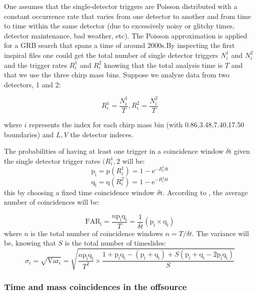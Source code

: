 \documentclass[epsf]{article}
\begin{document}
One assumes that the single-detector triggers are Poisson distributed with a constant occurrence rate that varies from one detector to another and from time to time within the same detector (due to excessively noisy or glitchy times, detector maintenance, bad weather, etc). The Poisson approximation is applied for a GRB search that spans a time of around 2000s.By inspecting the first inspiral files one could get the total number of single detector triggers $N_{i}^1$ and $N_{i}^2$ and the trigger rates $R_{i}^1$ and $R_{i}^2$ knowing that the total analysis time is $T$ and that we use the three chirp mass bins. Suppose we analyze data from two detectors, 1 and 2:

\begin{equation}
\label{rats}
R_{i}^1 = \frac{N_{i}^1}{T}, R_{i}^2 = \frac{N_{i}^2}{T}
\end{equation}

where $i$ represents the index for each chirp mass bin (with 0.86,3.48,7.40,17.50 boundaries) and $L,V$ the detector indeces.

The probabilities of having at least one trigger in a coincidence window $\delta$t given the single detector trigger rates $(R_{i}^1,2$ will be:
%
\begin{equation}
\label{pei}
\mathrm{p_i} = \mathrm{p}(R_{i}^1) = 1- \mathrm{e}^{-R_{i}^1 \delta t}
\end{equation}
%
\begin{equation}
\label{qui}
\mathrm{q_i} = \mathrm{q}(R_{i}^2) = 1- \mathrm{e}^{-R_{i}^2 \delta t}
\end{equation}
%
this by choosing a fixed time coincidence window $\delta$t. According to \cite{Was1}, the average number of coincidences will be:

\begin{equation}
\label{farski}
\mathrm{FAR_i} = \frac{n\mathrm{p_iq_i}}{T} = \frac{1}{\delta t} (\mathrm{p_i} \times \mathrm{q_i})
\end{equation}
%
where $n$ is the total number of coincidence windows $n=T/ \delta t$. The variance will be, knowing that $S$ is the total number of timeslides:
%
\begin{equation}
\sigma_i = \sqrt{\mathrm{Var}_i} = \sqrt{\frac{n\mathrm{p_iq_i}}{T^2} \times \frac{1+\mathrm{p_iq_i}-(\mathrm{p_i+q_i})+S(\mathrm{p_i+q_i-2p_iq_i})}{S}}
\label{sigmatime}
\end{equation} 

\subsubsection{Time and mass coincidences in the offsource}
\end{document}
